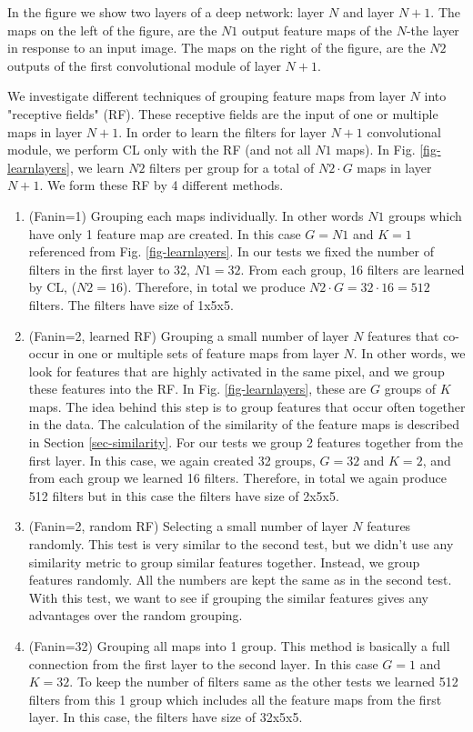 \documentclass{article} %
\begin{document}
In the figure we show two layers of a deep network: layer $N$ and layer $N+1$. The maps on the left of the figure, 
are the $N1$ output feature maps of the $N$-the layer in response to an input image. The maps on the right of the figure, 
are the $N2$ outputs of the first convolutional module of layer $N+1$. 

We investigate  different techniques of grouping feature maps from layer $N$ into "receptive fields" (RF). These receptive fields 
are the input of one or multiple maps in layer $N+1$. In order to learn the filters for layer $N+1$ convolutional module, we 
perform CL only with the RF (and not all $N1$ maps). In Fig. \ref{fig-learnlayers}, we learn $N2$ filters per group for a total of 
$N2 \cdot G$ maps in layer $N+1$.
We form these RF by 4 different methods. 
\begin{enumerate}
\item (Fanin=1) Grouping each maps individually. In other words $N1$ groups which have only 1 feature map are created. In this case $G = N1$ and $K = 1$ referenced 
 from Fig. \ref{fig-learnlayers}. In our tests we fixed the number of filters in the first layer to 32, $N1=32$. 
 From each group, 16 filters are learned by CL, ($N2 = 16$). Therefore, in total we produce $N2 \cdot G = 32 \cdot 16 = 512$ filters. 
 The filters have size of 1x5x5. 
 \item (Fanin=2, learned RF) Grouping a small number of layer $N$ features that co-occur in one or multiple sets of feature maps from layer $N$. 
 In other words, we look for features that are highly activated in the same pixel, and we group these features into the RF.
  In Fig. \ref{fig-learnlayers}, these are $G$ groups of $K$ maps. The idea behind this step is to group features that occur 
  often together in the data. The calculation of the similarity of the feature maps is described in Section \ref{sec-similarity}.
  For our tests we group 2 features together from the first layer. In this case, we again created 32  groups, $G = 32$ and $K = 2$,
  and from each group we learned 16 filters. Therefore, in total we again produce 512 filters but in this case the filters have size 
  of 2x5x5. 
\item (Fanin=2, random RF) Selecting a small number of layer $N$ features randomly. This test is very similar to the second test, but we didn't 
use any similarity metric to group similar features together. Instead, we group features randomly. All the numbers are kept the same as in 
the second test. With this test, we want to see if grouping the similar features gives any advantages over the random grouping.
\item (Fanin=32) Grouping all maps into 1 group. This method is basically a full connection from the first layer to the second layer. 
In this case $G = 1$ and $K = 32$. To keep the number of filters same as the other tests we learned 512 filters from this 
1 group which includes all the feature maps from the first layer. In this case,  the filters have size of 32x5x5. 
\end{enumerate}
\end{document}
